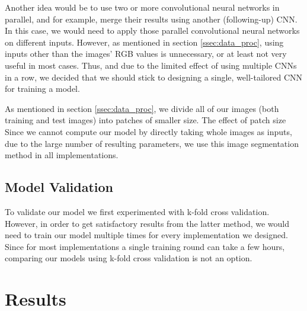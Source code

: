 \documentclass[10pt,conference,compsocconf]{IEEEtran}
\begin{document}
Another idea would be to use two or more convolutional neural networks in parallel, and for example, merge their results using another (following-up) CNN. In this case, we would need to apply those parallel convolutional neural networks on different inputs. However, as mentioned in section \ref{ssec:data_proc}, using inputs other than the images' RGB values is unnecessary, or at least not very useful in most cases. Thus, and due to the limited effect of using multiple CNNs in a row, we decided that we should stick to designing a single, well-tailored CNN for training a model.

As mentioned in section \ref{ssec:data_proc}, we divide all of our images (both training and test images) into patches of smaller size. The effect of patch size
Since we cannot compute our model by directly taking whole images as inputs, due to the large number of resulting parameters, we use this image segmentation method in all implementations.





\subsection{Model Validation} 
\label{ssec:model_validation}

To validate our model we first experimented with k-fold cross validation. However, in order to get satisfactory results from the latter method, we would need to train our model multiple times for every implementation we designed. Since for most implementations a single training round can take a few hours, comparing our models using k-fold cross validation is not an option.



\section{Results}
\label{sec:results}
\end{document}
